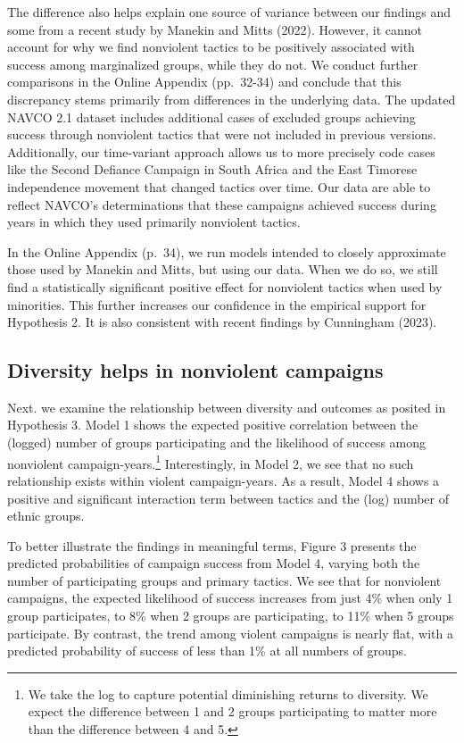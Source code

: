 \documentclass[
  letterpaper,
  DIV=11,
  numbers=noendperiod]{scrartcl}
\begin{document}
The difference also helps explain one source of variance between our
findings and some from a recent study by Manekin and Mitts (2022).
However, it cannot account for why we find nonviolent tactics to be
positively associated with success among marginalized groups, while they
do not. We conduct further comparisons in the Online Appendix
(pp.~32-34) and conclude that this discrepancy stems primarily from
differences in the underlying data. The updated NAVCO 2.1 dataset
includes additional cases of excluded groups achieving success through
nonviolent tactics that were not included in previous versions.
Additionally, our time-variant approach allows us to more precisely code
cases like the Second Defiance Campaign in South Africa and the East
Timorese independence movement that changed tactics over time. Our data
are able to reflect NAVCO's determinations that these campaigns achieved
success during years in which they used primarily nonviolent tactics.

In the Online Appendix (p.~34), we run models intended to closely
approximate those used by Manekin and Mitts, but using our data. When we
do so, we still find a statistically significant positive effect for
nonviolent tactics when used by minorities. This further increases our
confidence in the empirical support for Hypothesis 2. It is also
consistent with recent findings by Cunningham (2023).

\subsection{\texorpdfstring{\textbf{Diversity helps in nonviolent
campaigns}}{Diversity helps in nonviolent campaigns}}\label{diversity-helps-in-nonviolent-campaigns}

Next. we examine the relationship between diversity and outcomes as
posited in Hypothesis 3. Model 1 shows the expected positive correlation
between the (logged) number of groups participating and the likelihood
of success among nonviolent campaign-years.\footnote{We take the log to
  capture potential diminishing returns to diversity. We expect the
  difference between 1 and 2 groups participating to matter more than
  the difference between 4 and 5.} Interestingly, in Model 2, we see
that no such relationship exists within violent campaign-years. As a
result, Model 4 shows a positive and significant interaction term
between tactics and the (log) number of ethnic groups.

To better illustrate the findings in meaningful terms, Figure 3 presents
the predicted probabilities of campaign success from Model 4, varying
both the number of participating groups and primary tactics. We see that
for nonviolent campaigns, the expected likelihood of success increases
from just 4\% when only 1 group participates, to 8\% when 2 groups are
participating, to 11\% when 5 groups participate. By contrast, the trend
among violent campaigns is nearly flat, with a predicted probability of
success of less than 1\% at all numbers of groups.
\end{document}
